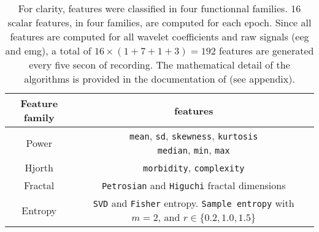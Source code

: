 

\begin {table}[!h]
\begin{center}
\caption{
For clarity, features were classified in four functionnal families.
16 scalar features, in four families, are computed for each epoch.
Since all features are computed for all wavelet coefficients and raw signals (\gls{eeg} and \gls{emg}), a total of 
$16 \times (1+7 + 1 + 3) = 192$ features are generated every five secon of recording.
The mathematical detail of the algorithms is provided in the documentation of \pr{} (see appendix).
\label{tab:features}}

\small
\begin{tabular}{|c|c|}
  \hline
  Feature family & features\\
 \hline
 \hline
  Power & \specialcell{\texttt{mean}, \texttt{sd}, \texttt{skewness}, \texttt{kurtosis}\\\texttt{median}, \texttt{min}, \texttt{max}}\\
  \hline
  Hjorth & \texttt{morbidity}, \texttt{complexity}\\
  \hline
  Fractal & \texttt{Petrosian} and \texttt{Higuchi} fractal dimensions\\
  \hline
  Entropy & \specialcell{\texttt{SVD} and \texttt{Fisher} entropy.\\\texttt{Sample entropy} with $m=2$, and $ r \in \{ 0.2, 1.0, 1.5\}$}\\
 \hline



\end{tabular}
\end{center}
\end{table}

